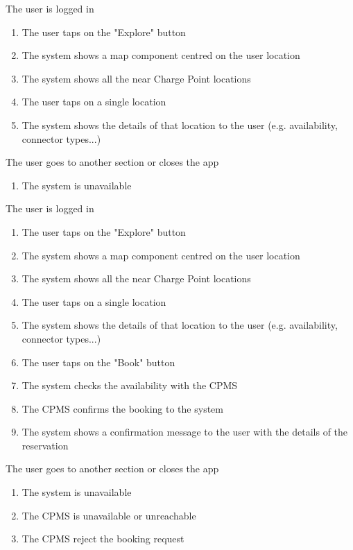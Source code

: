 \begin{enumerate}
	
	{The user is logged in}
	{
	\begin{enumerate}[1.]
	\item The user taps on the "Explore" button
	\item The system shows a map component centred on the user location
	\item The system shows all the near Charge Point locations
	\item The user taps on a single location
	\item The system shows the details of that location to the user (e.g. availability, connector types...)
	\end{enumerate}
	}
	{The user goes to another section or closes the app}
	{
	\begin{enumerate}[1.]
	\item The system is unavailable
	\end{enumerate}
	}
	
	
	{The user is logged in}
	{
	\begin{enumerate}[1.]
	\item The user taps on the "Explore" button
	\item The system shows a map component centred on the user location
	\item The system shows all the near Charge Point locations
	\item The user taps on a single location
	\item The system shows the details of that location to the user (e.g. availability, connector types...)
	\item The user taps on the "Book" button
	\item The system checks the availability with the CPMS
	\item The CPMS confirms the booking to the system
	\item The system shows a confirmation message to the user with the details of the reservation
	\end{enumerate}
	}
	{The user goes to another section or closes the app}
	{
	\begin{enumerate}[1.]
	\item The system is unavailable
	\item The CPMS is unavailable or unreachable
	\item The CPMS reject the booking request
	\end{enumerate}
	}
	

\end{enumerate}
